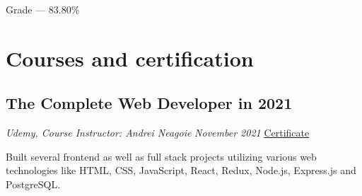 \documentclass[a4paper]{article}
\begin{document}
Grade --- 83.80\%

\section{Courses and certification}
\subsection{The Complete Web Developer in 2021}
\textit{Udemy, Course Instructor: Andrei Neagoie}
\hfill
\textit{November 2021} \textbar \href{https://www.udemy.com/certificate/UC-13ddb4ce-86c8-4396-9cb7-701f5c522fd8/}{  Certificate \faExternalLink}

Built several frontend as well as full stack projects utilizing various web technologies like HTML, CSS, JavaScript, React, Redux, Node.js, Express.js and PostgreSQL.
\end{document}
